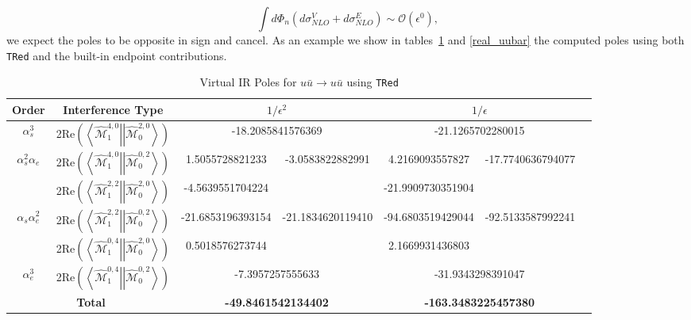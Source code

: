 \documentclass[a4paper]{article}
\def \TRed{\texttt{TRed} }
\def \MBra#1#2#3{\left<\hat{\mathcal{M}}_{#1}^{#2,#3}\right|}
\def \MKet#1#2#3{\left|\hat{\mathcal{M}}_{#1}^{#2,#3}\right>}
\begin{document}
\begin{equation}
 \int d\Phi_n \left(d\sigma_{NLO}^V + d\sigma_{NLO}^E\right) \sim \mathcal{O}(\epsilon^0),
 \label{cancellation}
\end{equation}
we expect the poles to be opposite in sign and cancel. As an example we show in tables~\ref{virt_uubar} and  \ref{real_uubar} the computed poles using both \TRed and the built-in endpoint contributions. 


\begin{table}[]
 \begin{tabular}{|c|c|c|c|c|c|c}\hline
 Order& Interference Type
 & \multicolumn{2}{c}{$1/\epsilon^{2}$} 
 & \multicolumn{2}{|c|}{$1/\epsilon$}\\\hline
 $\alpha_s^3$                           
 & 2Re$\left(\MBra{1}{4}{0}\MKet{0}{2}{0}\right)$
 & \multicolumn{2}{c|}{-18.2085841576369} 
 & \multicolumn{2}{c|}{-21.1265702280015} \\\hline
 \multirow{2}{*}{$\alpha_s^2\alpha_e$}                                                        
 & 2Re$\left(\MBra{1}{4}{0}\MKet{0}{0}{2}\right)$
 & 1.5055728821233 & \multirow{2}{*}{-3.0583822882991} 
 & 4.2169093557827 & \multirow{2}{*}{-17.7740636794077} \\
 & 2Re$\left(\MBra{1}{2}{2}\MKet{0}{2}{0}\right)$
 & -4.5639551704224 && -21.9909730351904 &\\\hline
 \multirow{2}{*}{$\alpha_s\alpha_e^2$}                                                  
 & 2Re$\left(\MBra{1}{2}{2}\MKet{0}{0}{2}\right)$
 & -21.6853196393154 & \multirow{2}{*}{-21.1834620119410} 
 & -94.6803519429044 & \multirow{2}{*}{-92.5133587992241} \\
 & 2Re$\left(\MBra{1}{0}{4}\MKet{0}{2}{0}\right)$
 & 0.5018576273744 && 2.1669931436803 &\\\hline
 $\alpha_e^3$                                                                             
 & 2Re$\left(\MBra{1}{0}{4}\MKet{0}{0}{2}\right)$
 & \multicolumn{2}{c|}{-7.3957257555633} 
 & \multicolumn{2}{c|}{-31.9343298391047} \\\hline
   \multicolumn{2}{|c|}{\textbf{Total}}     
 & \multicolumn{2}{c|}{\textbf{-49.8461542134402}} 
 & \multicolumn{2}{c|}{\textbf{-163.3483225457380}}\\\hline
 \end{tabular}
 \caption{Virtual IR Poles for $u\bar u\longrightarrow u\bar u$ using \TRed}
 \label{virt_uubar}
 
 
\vskip 0.75cm


\end{table}
\end{document}
